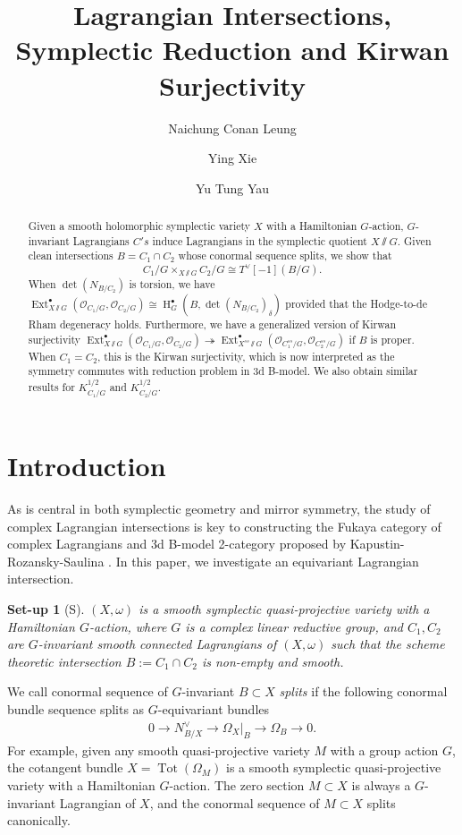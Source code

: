 \documentclass[12pt]{amsart}
\title[]{Lagrangian Intersections, Symplectic Reduction and Kirwan Surjectivity}
\author[NC. Leung]{Naichung Conan Leung}
\author[Y. Xie]{Ying Xie}
\author[YT. Yau]{Yu Tung Yau}
\newtheorem*{setup}{Set-up}
\theoremstyle{definition}
\theoremstyle{remark}
\numberwithin{equation}{section}
\newcommand{\shO}{\mathcal{O}}
\newcommand{\Ext}{\operatorname{Ext}}
\newcommand{\Tot}{\operatorname{Tot}}
\newcommand{\arw}{\longrightarrow}
\newcommand{\Hdot}{\operatorname{H}}
\begin{document}
\begin{abstract}
Given a smooth holomorphic symplectic variety $X$ with a Hamiltonian $G$-action, $G$-invariant Lagrangians $C's$ induce Lagrangians in the symplectic quotient $X\sslash  G$. Given clean intersections $B=C_1\cap C_2$ whose conormal sequence splits, we show that 
$$C_1/G\times_{X\sslash G} C_2/G\cong T^{\vee}[-1](B/G).$$
When $\det(N_{B/C_2})$ is torsion, we have $\Ext^{\bullet}_{X\sslash G}(\shO_{C_1/G}, \shO_{C_2/G})\cong \Hdot^{\bullet}_G(B, \det(N_{B/C_2})_{\delta})$ provided that the Hodge-to-de Rham degeneracy holds. Furthermore, we have a generalized version of Kirwan surjectivity
$\Ext^{\bullet}_{X\sslash G}(\shO_{C_1/G}, \shO_{C_2/G})\twoheadrightarrow \Ext^{\bullet}_{X^{ss}\sslash G}(\shO_{C_1^{ss}/G}, \shO_{C_2^{ss}/G})$ if $B$ is proper. When $C_1=C_2$, this is the Kirwan surjectivity, which is now interpreted as the symmetry commutes with reduction problem in 3d B-model. We also obtain similar results for $K_{C_1/G}^{1/2}$ and $K_{C_2/G}^{1/2}$. 
\end{abstract}

\maketitle
\section{Introduction}
As is central in both symplectic geometry and mirror symmetry, the study of complex Lagrangian intersections is key to constructing the Fukaya category of complex Lagrangians and 3d B-model 2-category proposed by Kapustin-Rozansky-Saulina \cite{kapustin2009three}. In this paper, we investigate an equivariant Lagrangian intersection. 
\begin{setup}[S]\label{setup}
$(X,\omega)$ is a smooth symplectic quasi-projective variety with a Hamiltonian $G$-action, where $G$ is a complex linear reductive group, and $C_1, C_2$ are $G$-invariant smooth connected Lagrangians of $(X, \omega)$ such that the scheme theoretic intersection $B:=C_1\cap C_2$ is non-empty and smooth.
\end{setup}
We call conormal sequence of $G$-invariant $B\subset X$ \emph{splits} if the following conormal bundle sequence splits as $G$-equivariant bundles
\begin{align*}
    0\arw N^{\vee}_{B/X}\arw \Omega_X|_B \arw \Omega_B\arw 0. 
 \end{align*}
For example, given any smooth quasi-projective variety $M$ with a group action $G$, the cotangent bundle $X=\Tot(\Omega_M)$ is a smooth symplectic quasi-projective variety with a Hamiltonian $G$-action. The zero section $M\subset X$ is always a $G$-invariant Lagrangian of $X$, and the conormal sequence of $M\subset X$ splits canonically.
\end{document}
